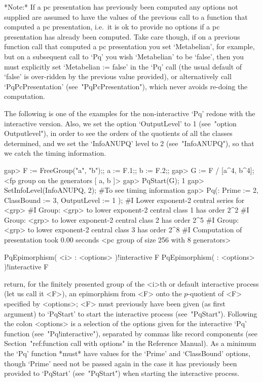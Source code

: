 *Note:*
If a pc  presentation  has  previously  been  computed  any  options  not
supplied are assumed to have  the  values  of  the  previous  call  to  a
function that computed a pc presentation, i.e.~it is  ok  to  provide  no
options if a pc presentation has already been computed. Take care though,
if on a previous function call that computed a pc  presentation  you  set
`Metabelian', for example, but on a subsequent  call  to  `Pq'  you  wish
`Metabelian' to be `false', then you must explicitly set  `Metabelian  :=
false' in the `Pq' call (the usual default of `false' is  over-ridden  by
the previous value provided), or  alternatively  call  `PqPcPresentation'
(see~"PqPcPresentation"), which never avoids re-doing the computation.

The following is one of the examples for the non-interactive `Pq'  redone
with the interactive version. Also, we set the option `OutputLevel' to  1
(see~"option   Outputlevel"), in order to see the orders of the quotients
of all the classes determined, and we set  the  `InfoANUPQ'  level  to  2
(see~"InfoANUPQ"), so that we catch the timing information.

\beginexample
gap> F := FreeGroup("a", "b");; a := F.1;; b := F.2;;
gap> G := F / [a^4, b^4];
<fp group on the generators [ a, b ]>
gap> PqStart(G);
1
gap> SetInfoLevel(InfoANUPQ, 2); #To see timing information               
gap> Pq(: Prime := 2, ClassBound := 3, OutputLevel := 1 );
#I  Lower exponent-2 central series for <grp>
#I  Group: <grp> to lower exponent-2 central class 1 has order 2^2
#I  Group: <grp> to lower exponent-2 central class 2 has order 2^5
#I  Group: <grp> to lower exponent-2 central class 3 has order 2^8
#I  Computation of presentation took 0.00 seconds
<pc group of size 256 with 8 generators>
\endexample

\>PqEpimorphism( <i> : <options> )!{interactive} F
\>PqEpimorphism( : <options> )!{interactive} F

return, for  the  finitely  presented  group  of  the  <i>th  or  default
interactive {\ANUPQ} process (let us call it <F>),  an  epimorphism  from
<F> onto the  $p$-quotient  of  <F>  specified  by  <options>;  <F>  must
previously have been given (as first argument) to `PqStart' to start  the
interactive  {\ANUPQ}  process  (see~"PqStart").  Following   the   colon
<options> is a selection of the options given for  the  interactive  `Pq'
function  (see~"Pq!interactive"),  separated  by   commas   like   record
components (see Section~"ref:function call with options"  in  the  {\GAP}
Reference Manual). As a minimum the `Pq' function *must* have values  for
the `Prime' and `ClassBound' options, though `Prime' need not  be  passed
again  in  the  case  it  has  previously  been  provided  to   `PqStart'
(see~"PqStart") when starting the interactive process.

